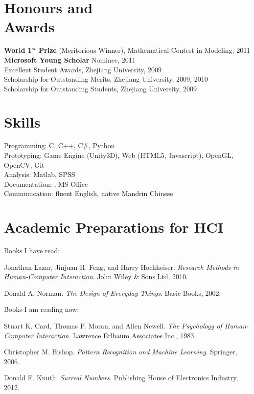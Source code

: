 \documentclass[margin,line]{resume}
\begin{document}
\begin{resume}
    \section{\mysidestyle Honours and\\Awards} 

   \textbf{World 1$^{st}$ Prize} (Meritorious Winner), Mathematical Contest in Modeling, 2011 \\
   \textbf{Microsoft Young Scholar} Nominee, 2011\\
   Excellent Student Awards, Zhejiang University, 2009\\
   Scholarship for Outstanding Merits, Zhejiang University, 2009, 2010\\
   Scholarship for Outstanding Students, Zhejiang University, 2009

    \section{\mysidestyle Skills} 
    
    Programming: C, C++, C\#, Python \\
    Prototyping: Game Engine (Unity3D), Web (HTML5, Javascript), OpenGL, OpenCV, Git\\
    Analysis: Matlab, SPSS \\
    Documentation: \LaTeXe, MS Office \\
    Communication: fluent English, native Mandrin Chinese



    \section{\mysidestyle Academic Preparations for HCI} 
    
    Books I have read: 
    \begin{list2}
        \item Jonathan Lazar, Jinjuan H. Feng, and Harry Hochheiser. \textsl{Research Methods in Human-Computer Interaction}. John Wiley \& Sons Ltd, 2010.
	\item Donald A. Norman. \textsl{The Design of Everyday Things}. Basic Books, 2002.     
    \end{list2}
    \vspace{-3mm}
    Books I am reading now:
    \begin{list2}
   	\item Stuart K. Card, Thomas P. Moran, and Allen Newell. \textsl{The Psychology of Human-Computer Interaction}. Lawrence Erlbaum Associates Inc., 1983.
	 \item Christopher M. Bishop. \emph{Pattern Recognition and Machine Learning}. Springer, 2006.
	 \item Donald E. Knuth. \emph{Surreal Numbers}. Publishing House of Electronics Industry, 2012.
    \end{list2}
        

\end{resume}
\end{document}

